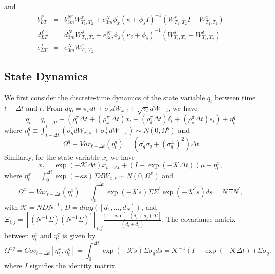 \documentclass{article}
\begin{document}
and%
\begin{eqnarray*}
b_{LT}^{f\prime } &=&b_{3m}^{N\prime }W_{T_{1},T_{2}}^{x}+e_{3m}^{N}\phi
_{x}^{\prime }\left( \kappa +\phi _{s}I\right) ^{-1}\left(
W_{T_{1},T_{2}}^{s}I-W_{T_{1},T_{2}}^{x}\right)  \\
d_{LT}^{f} &=&d_{3m}^{N}W_{T_{1},T_{2}}^{\delta }+e_{3m}^{N}\phi _{\delta
}\left( \kappa _{\delta }+\phi _{s}\right) ^{-1}\left(
W_{T_{1},T_{2}}^{s}-W_{T_{1},T_{2}}^{\delta }\right)  \\
e_{LT}^{f} &=&e_{3m}^{N}W_{T_{1},T_{2}}^{s}
\end{eqnarray*}

\subsection{State Dynamics}

We first consider the discrete-time dynamics of the state variable $q_{t}$
between time $t-\Delta t$ and $t$. From $dq_{t}=\pi _{t}dt+\sigma
_{q}^{\prime }dW_{x,t}+\sqrt{v_{t}}dW_{\bot ,t}$, we have%
\begin{equation*}
q_{t}=q_{t-\Delta t}+\left( \rho _{0}^{\pi }\Delta t+\left( \rho _{x}^{\pi
\prime }\Delta t\right) x_{t}+\left( \rho _{\delta }^{\pi }\Delta t\right)
\delta _{t}+\left( \rho _{s}^{\pi }\Delta t\right) s_{t}\right) +\eta
_{t}^{q}
\end{equation*}%
where $\eta _{t}^{q}\equiv \int_{t-\Delta t}^{t}\left( \sigma _{q}^{\prime
}dW_{x,s}+\sigma _{q}^{\bot }dW_{\bot ,s}\right) \sim N\left( 0,\Omega
^{q}\right) $ and%
\begin{equation*}
\Omega ^{q}\equiv Var_{t-\Delta t}\left( \eta _{t}^{q}\right) =\left( \sigma
_{q}^{\prime }\sigma _{q}+\left( \sigma _{q}^{\bot }\right) ^{2}\right)
\Delta t
\end{equation*}%
Similarly, for the state variable $x_{t}$ we have%
\begin{equation*}
x_{t}=\exp \left( -\mathcal{K}\Delta t\right) x_{t-\Delta t}+\left( I-\exp
\left( -\mathcal{K}\Delta t\right) \right) \mu +\eta _{t}^{x},
\end{equation*}%
where $\eta _{t}^{x}=\int_{0}^{\Delta t}\exp \left( -\kappa s\right) \Sigma
dW_{x,s}\sim N\left( 0,\Omega ^{x}\right) $ and%
\begin{equation*}
\Omega ^{x}\equiv Var_{t-\Delta t}\left( \eta _{t}^{x}\right)
=\int_{0}^{\Delta t}\exp \left( -\mathcal{K}s\right) \Sigma \Sigma ^{\prime
}\exp \left( -\mathcal{K}^{\prime }s\right) ds=N\Xi N^{\prime },
\end{equation*}%
with $\mathcal{K=}NDN^{-1}$, $D=diag\left( \left[ d_{1},...,d_{N}\right]
\right) $, and $\Xi _{i,j}=\left[ (N^{-1}\Sigma )(N^{-1}\Sigma )^{\prime }%
\right] _{i,j}\frac{1-\exp \left[ -\left( d_{i}+d_{j}\right) \mathcal{\Delta 
}t\right] }{\left( d_{i}+d_{j}\right) }$. The covariance matrix between $%
\eta _{t}^{x}$ and $\eta _{t}^{q}$ is given by%
\begin{equation*}
\Omega ^{xq}=Cov_{t-\Delta t}\left[ \eta _{t}^{x},\eta _{t}^{q}\right]
=\int_{0}^{\Delta t}\exp \left( -\mathcal{K}s\right) \Sigma \sigma _{q}ds=%
\mathcal{K}^{-1}\left( I-\exp \left( -\mathcal{K}\Delta t\right) \right)
\Sigma \sigma _{q}.
\end{equation*}%
where $I$ signifies the identity matrix.
\end{document}
